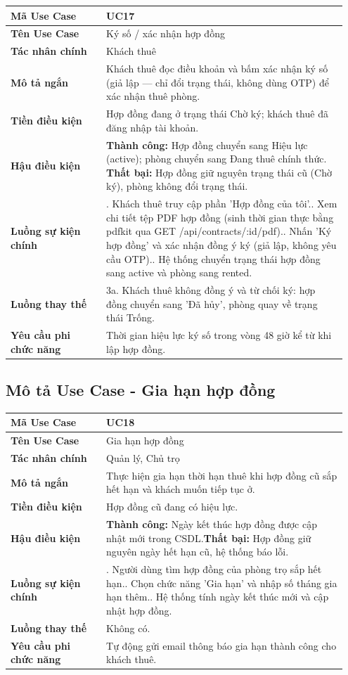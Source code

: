 \documentclass[a4paper,oneside]{report}
\begin{document}
\begin{longtable}[]{@{}>{\RaggedRight\arraybackslash}p{0.27\linewidth}>{\RaggedRight\arraybackslash}p{0.68\linewidth}@{}}
\toprule
\textbf{Mã Use Case} & UC17\tabularnewline
\midrule
\endhead
\textbf{Tên Use Case} & Ký số / xác nhận hợp đồng\tabularnewline
\textbf{Tác nhân chính} & Khách thuê\tabularnewline
\textbf{Mô tả ngắn} & Khách thuê đọc điều khoản và bấm xác nhận ký số
(giả lập --- chỉ đổi trạng thái, không dùng OTP) để xác nhận thuê
phòng.\tabularnewline
\textbf{Tiền điều kiện} & Hợp đồng đang ở trạng thái Chờ ký; khách thuê
đã đăng nhập tài khoản.\tabularnewline
\textbf{Hậu điều kiện} & \textbf{Thành công:} Hợp đồng chuyển sang Hiệu lực (active); phòng chuyển sang Đang thuê chính thức.\newline 
\textbf{Thất bại:} Hợp đồng giữ nguyên trạng thái cũ (Chờ ký), phòng không đổi trạng thái.\tabularnewline
\textbf{Luồng sự kiện chính} & 1. Khách thuê truy cập
phần 'Hợp đồng của tôi'.\newline 2. Xem chi tiết tệp PDF hợp đồng
(sinh thời gian thực bằng pdfkit qua GET
/api/contracts/:id/pdf).\newline 3. Nhấn 'Ký hợp đồng' và xác nhận
đồng ý ký (giả lập, không yêu cầu OTP).\newline 4. Hệ thống chuyển
trạng thái hợp đồng sang active và phòng sang rented.\tabularnewline
\textbf{Luồng thay thế} & 3a. Khách thuê không đồng ý và từ chối ký: hợp
đồng chuyển sang 'Đã hủy', phòng quay về trạng thái
Trống.\tabularnewline
\textbf{Yêu cầu phi chức năng} & Thời gian hiệu lực ký số trong vòng 48
giờ kể từ khi lập hợp đồng.\tabularnewline
\bottomrule
\end{longtable}

\subsection{Mô tả Use Case - Gia hạn hợp đồng}

\begin{longtable}[]{@{}>{\RaggedRight\arraybackslash}p{0.27\linewidth}>{\RaggedRight\arraybackslash}p{0.68\linewidth}@{}}
\toprule
\textbf{Mã Use Case} & UC18\tabularnewline
\midrule
\endhead
\textbf{Tên Use Case} & Gia hạn hợp đồng\tabularnewline
\textbf{Tác nhân chính} & Quản lý, Chủ trọ\tabularnewline
\textbf{Mô tả ngắn} & Thực hiện gia hạn thời hạn thuê khi hợp đồng cũ
sắp hết hạn và khách muốn tiếp tục ở.\tabularnewline
\textbf{Tiền điều kiện} & Hợp đồng cũ đang có hiệu lực.\tabularnewline
\textbf{Hậu điều kiện} & \textbf{Thành công:} Ngày kết thúc hợp đồng được cập nhật mới trong CSDL.\newline \textbf{Thất bại:} Hợp đồng giữ nguyên ngày hết hạn cũ, hệ thống báo lỗi.\tabularnewline
\textbf{Luồng sự kiện chính} & 1. Người dùng tìm hợp
đồng của phòng trọ sắp hết hạn.\newline 2. Chọn chức năng 'Gia hạn'
và nhập số tháng gia hạn thêm.\newline 3. Hệ thống tính ngày kết
thúc mới và cập nhật hợp đồng.\tabularnewline
\textbf{Luồng thay thế} & Không có.\tabularnewline
\textbf{Yêu cầu phi chức năng} & Tự động gửi email thông báo gia hạn
thành công cho khách thuê.\tabularnewline
\bottomrule
\end{longtable}
\end{document}
